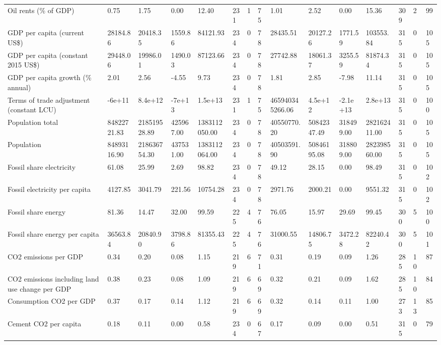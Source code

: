 \begin{longtable}{lllllllllllllll}
Oil rents (\% of GDP) & 0.75 & 1.75 & 0.00 & 12.40 & 231 & 1 & 75 & 1.01 & 2.52 & 0.00 & 15.36 & 309 & 2 & 99\\
GDP per capita (current US\$) & 28184.86 & 20418.35 & 1559.86 & 84121.93 & 234 & 0 & 78 & 28435.51 & 20127.26 & 1771.59 & 103553.84 & 315 & 0 & 105\\
GDP per capita (constant 2015 US\$) & 29448.06 & 19986.01 & 1490.03 & 87123.66 & 234 & 0 & 78 & 27742.88 & 18061.37 & 3255.59 & 81874.34 & 315 & 0 & 105\\
\addlinespace
GDP per capita growth (\% annual) & 2.01 & 2.56 & -4.55 & 9.73 & 234 & 0 & 78 & 1.81 & 2.85 & -7.98 & 11.14 & 315 & 0 & 105\\
Terms of trade adjustment (constant LCU) & -6e+11 & 8.4e+12 & -7e+13 & 1.5e+13 & 231 & 1 & 75 & 465940345266.06 & 4.5e+12 & -2.1e+13 & 2.8e+13 & 315 & 0 & 100\\
Population total & 84822721.83 & 218519528.89 & 425967.00 & 1383112050.00 & 234 & 0 & 78 & 40550770.20 & 50842347.49 & 318499.00 & 282162411.00 & 315 & 0 & 105\\
Population & 84893116.90 & 218636754.30 & 437531.00 & 1383112064.00 & 234 & 0 & 78 & 40503591.90 & 50846195.08 & 318809.00 & 282398560.00 & 315 & 0 & 105\\
Fossil share electricity & 61.08 & 25.99 & 2.69 & 98.82 & 234 & 0 & 78 & 49.12 & 28.15 & 0.00 & 98.49 & 315 & 0 & 102\\
\addlinespace
Fossil electricity per capita & 4127.85 & 3041.79 & 221.56 & 10754.28 & 234 & 0 & 78 & 2971.76 & 2000.21 & 0.00 & 9551.32 & 315 & 0 & 102\\
Fossil share energy & 81.36 & 14.47 & 32.00 & 99.59 & 225 & 4 & 76 & 76.05 & 15.97 & 29.69 & 99.45 & 300 & 5 & 100\\
Fossil share energy per capita & 36563.84 & 20840.90 & 3798.86 & 81355.43 & 225 & 4 & 76 & 31000.55 & 14806.75 & 3472.28 & 82240.42 & 300 & 5 & 101\\
CO2 emissions per GDP & 0.34 & 0.20 & 0.08 & 1.15 & 219 & 6 & 71 & 0.31 & 0.19 & 0.09 & 1.26 & 285 & 10 & 87\\
CO2 emissions including land use change per GDP & 0.38 & 0.23 & 0.08 & 1.09 & 219 & 6 & 69 & 0.32 & 0.21 & 0.09 & 1.62 & 285 & 10 & 84\\
\addlinespace
Consumption CO2 per GDP & 0.37 & 0.17 & 0.14 & 1.12 & 219 & 6 & 69 & 0.32 & 0.14 & 0.11 & 1.00 & 273 & 13 & 85\\
Cement CO2 per capita & 0.18 & 0.11 & 0.00 & 0.58 & 234 & 0 & 67 & 0.17 & 0.09 & 0.00 & 0.51 & 315 & 0 & 79\\

\end{longtable}
